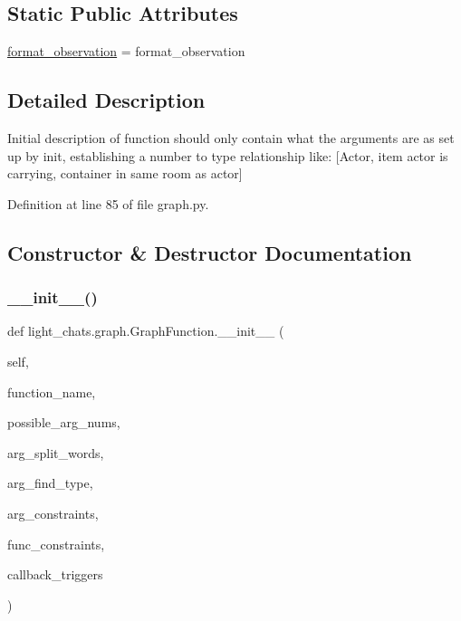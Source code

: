 \subsection*{Static Public Attributes}
\begin{DoxyCompactItemize}
\item 
\hyperlink{classlight__chats_1_1graph_1_1GraphFunction_a40c1214e286a5c8ca375aae48bf36d89}{format\+\_\+observation} = format\+\_\+observation
\end{DoxyCompactItemize}


\subsection{Detailed Description}
\begin{DoxyVerb}Initial description of function should only contain what the arguments
are as set up by init, establishing a number to type relationship like:
[Actor, item actor is carrying, container in same room as actor]
\end{DoxyVerb}
 

Definition at line 85 of file graph.\+py.



\subsection{Constructor \& Destructor Documentation}
\mbox{\label{classlight__chats_1_1graph_1_1GraphFunction_afcb6dd9e771c4db34f5af22588e6190e}} 
\subsubsection{\texorpdfstring{\+\_\+\+\_\+init\+\_\+\+\_\+()}{\_\_init\_\_()}}
{\footnotesize\ttfamily def light\+\_\+chats.\+graph.\+Graph\+Function.\+\_\+\+\_\+init\+\_\+\+\_\+ (\begin{DoxyParamCaption}\item[{}]{self,  }\item[{}]{function\+\_\+name,  }\item[{}]{possible\+\_\+arg\+\_\+nums,  }\item[{}]{arg\+\_\+split\+\_\+words,  }\item[{}]{arg\+\_\+find\+\_\+type,  }\item[{}]{arg\+\_\+constraints,  }\item[{}]{func\+\_\+constraints,  }\item[{}]{callback\+\_\+triggers }\end{DoxyParamCaption})}

